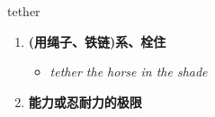 
\begin{frame}
{\huge tether}
\begin{center}
\begin{enumerate}\Large
  \item \textbf{(用绳子、铁链)系、栓住}
  \begin{itemize}
    \item \em{\Large{tether the horse in the shade}}
  \end{itemize}
  \item \textbf{能力或忍耐力的极限}
\end{enumerate}
\end{center}
\end{frame}
